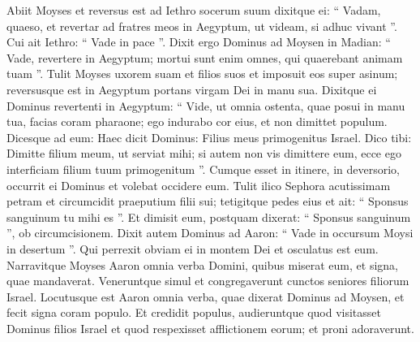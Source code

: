 \begin{biblechapter}
\begin{biblechapter}
\begin{biblechapter}
\begin{biblechapter}
 \verse Abiit Moyses et reversus est ad Iethro socerum suum dixitque ei: “ Vadam, quaeso, et revertar ad fratres meos in Aegyptum, ut videam, si adhuc vivant ”. Cui ait Iethro: “ Vade in pace ”. 
\verse Dixit ergo Dominus ad Moysen in Madian: “ Vade, revertere in Aegyptum; mortui sunt enim omnes, qui quaerebant animam tuam ”. 
\verse Tulit Moyses uxorem suam et filios suos et imposuit eos super asinum; reversusque est in Aegyptum portans virgam Dei in manu sua. 
\verse Dixitque ei Dominus revertenti in Aegyptum: “ Vide, ut omnia ostenta, quae posui in manu tua, facias coram pharaone; ego indurabo cor eius, et non dimittet populum. 
\verse Dicesque ad eum: Haec dicit Dominus: Filius meus primogenitus Israel. 
 \verse Dico tibi: Dimitte filium meum, ut serviat mihi; si autem non vis dimittere eum, ecce ego interficiam filium tuum primogenitum ”.
 \verse Cumque esset in itinere, in deversorio, occurrit ei Dominus et volebat occidere eum. 
\verse Tulit ilico Sephora acutissimam petram et circumcidit praeputium filii sui; tetigitque pedes eius et ait: “ Sponsus sanguinum tu mihi es ”. 
\verse Et dimisit eum, postquam dixerat: “ Sponsus sanguinum ”, ob circumcisionem.
 \verse Dixit autem Dominus ad Aaron: “ Vade in occursum Moysi in desertum ”. Qui perrexit obviam ei in montem Dei et osculatus est eum. 
\verse Narravitque Moyses Aaron omnia verba Domini, quibus miserat eum, et signa, quae mandaverat. 
\verse Veneruntque simul et congregaverunt cunctos seniores filiorum Israel. 
\verse Locutusque est Aaron omnia verba, quae dixerat Dominus ad Moysen, et fecit signa coram populo. 
\verse Et credidit populus, audieruntque quod visitasset Dominus filios Israel et quod respexisset afflictionem eorum; et proni adoraverunt.
 

\end{biblechapter}
\end{biblechapter}
\end{biblechapter}
\end{biblechapter}
